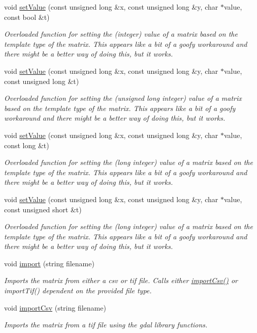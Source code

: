 \begin{DoxyCompactItemize}
void \hyperlink{class_matrix_a922762fa2b44b243ae23c9a009f1d097}{set\+Value} (const unsigned long \&x, const unsigned long \&y, char $\ast$value, const bool \&t)
\begin{DoxyCompactList}\small\item\em Overloaded function for setting the (integer) value of a matrix based on the template type of the matrix. This appears like a bit of a goofy workaround and there might be a better way of doing this, but it works. \end{DoxyCompactList}\item 
void \hyperlink{class_matrix_a559bd9956b135c07d4b9f4c7b7ab3587}{set\+Value} (const unsigned long \&x, const unsigned long \&y, char $\ast$value, const unsigned long \&t)
\begin{DoxyCompactList}\small\item\em Overloaded function for setting the (unsigned long integer) value of a matrix based on the template type of the matrix. This appears like a bit of a goofy workaround and there might be a better way of doing this, but it works. \end{DoxyCompactList}\item 
void \hyperlink{class_matrix_a143c4e675168a714dfb039e142cb9623}{set\+Value} (const unsigned long \&x, const unsigned long \&y, char $\ast$value, const long \&t)
\begin{DoxyCompactList}\small\item\em Overloaded function for setting the (long integer) value of a matrix based on the template type of the matrix. This appears like a bit of a goofy workaround and there might be a better way of doing this, but it works. \end{DoxyCompactList}\item 
void \hyperlink{class_matrix_a28788b5a7f7d5f107bf26f4d8fd43d1c}{set\+Value} (const unsigned long \&x, const unsigned long \&y, char $\ast$value, const unsigned short \&t)
\begin{DoxyCompactList}\small\item\em Overloaded function for setting the (long integer) value of a matrix based on the template type of the matrix. This appears like a bit of a goofy workaround and there might be a better way of doing this, but it works. \end{DoxyCompactList}\item 
void \hyperlink{class_matrix_ad52cb35470afb7a524e825b586cc2ccb}{import} (string filename)
\begin{DoxyCompactList}\small\item\em Imports the matrix from either a csv or tif file. Calls either \hyperlink{class_matrix_ace5dbaac7d1be865b2f366bfe8896a41}{import\+Csv()} or import\+Tif() dependent on the provided file type. \end{DoxyCompactList}\item 
void \hyperlink{class_matrix_ace5dbaac7d1be865b2f366bfe8896a41}{import\+Csv} (string filename)
\begin{DoxyCompactList}\small\item\em Imports the matrix from a tif file using the gdal library functions. \end{DoxyCompactList}\end{DoxyCompactItemize}
